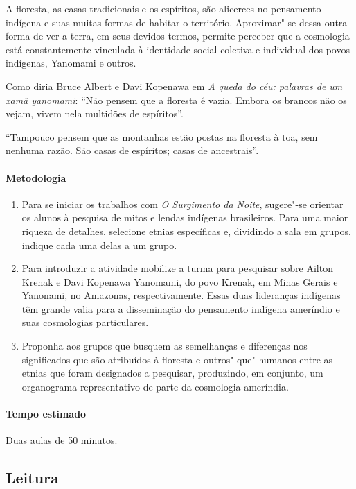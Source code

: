 \documentclass[12pt]{extarticle}
\begin{document}
A floresta, as casas tradicionais e os espíritos, são alicerces no pensamento 
indígena e suas muitas formas de habitar o território. Aproximar"-se dessa outra
forma de ver a terra, em seus devidos termos, permite perceber que a cosmologia 
está constantemente vinculada à identidade social coletiva e individual dos povos
indígenas, Yanomami e outros. 


Como diria Bruce Albert e Davi Kopenawa em \textit{A queda do céu: palavras de 
um xamã yanomami}: ``Não pensem que a floresta é vazia. Embora os brancos não os 
vejam, vivem nela multidões de espíritos''.

``Tampouco pensem que as montanhas estão postas na floresta à toa, sem nenhuma razão. 
São casas de espíritos; casas de ancestrais''.

\paragraph{Metodologia} 

\begin{enumerate}
\item Para se iniciar os trabalhos com \emph{O Surgimento
da Noite}, sugere"-se orientar os alunos à pesquisa de mitos e lendas
indígenas brasileiros. Para uma maior riqueza de detalhes, selecione
etnias específicas e, dividindo a sala em grupos, indique cada uma delas
a um grupo. 

\item Para introduzir a atividade mobilize a turma para pesquisar sobre Ailton 
Krenak e Davi Kopenawa Yanomami, do povo Krenak, em Minas Gerais e Yanonami,
no Amazonas, respectivamente. Essas duas lideranças indígenas têm grande valia 
para a disseminação do pensamento indígena ameríndio e suas cosmologias particulares.

\item Proponha aos grupos que busquem as semelhanças e diferenças nos significados que são 
atribuídos à floresta e outros"-que"-humanos entre as etnias que foram designados a pesquisar,
produzindo, em conjunto, um organograma representativo de parte da cosmologia ameríndia.  
\end{enumerate}

\paragraph{Tempo estimado} Duas aulas de 50 minutos. 


\subsection{Leitura}
\end{document}

